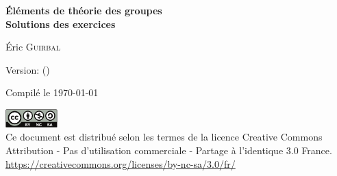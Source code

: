 
\thispagestyle{empty}
\null
\vfill
\begin{center}
  \small

  \textbf{%
    Éléments de théorie des groupes \\
    Solutions des exercices
  }
  \medskip

  Éric \textsc{Guirbal}

  \medskip

  Version: \gitDescribe{} (\gitDate)

  Compilé le \today

  \vfill

  \includegraphics[width=2cm]{images/cc-by-nc-sa} \\ [0.15cm]

  Ce document est distribué selon les termes de la licence Creative Commons
  Attribution - Pas d'utilisation commerciale - Partage à l'identique 3.0
  France. \\
  \url{https://creativecommons.org/licenses/by-nc-sa/3.0/fr/}
\end{center}

